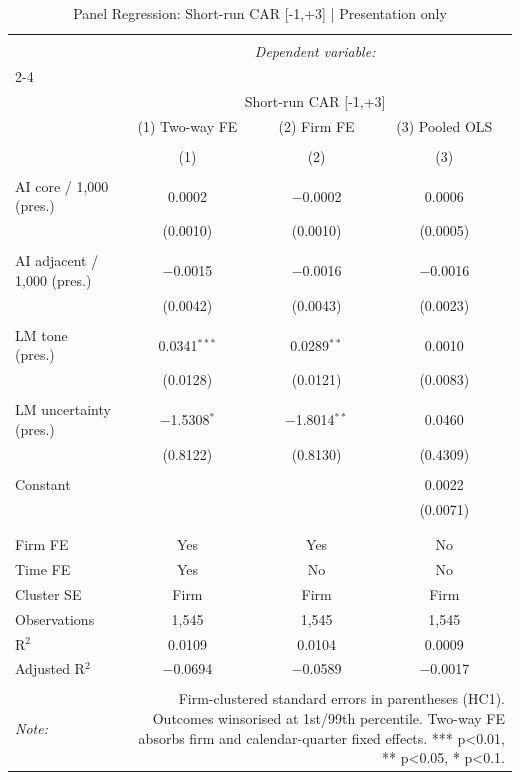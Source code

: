 
\begin{table}[!htbp] \centering 
  \caption{Panel Regression: Short-run CAR [-1,+3]  |  Presentation only} 
  \label{} 
\begin{tabular}{@{\extracolsep{5pt}}lccc} 
\\[-1.8ex]\hline 
\hline \\[-1.8ex] 
 & \multicolumn{3}{c}{\textit{Dependent variable:}} \\ 
\cline{2-4} 
\\[-1.8ex] & \multicolumn{3}{c}{Short-run CAR [-1,+3]} \\ 
 & (1) Two-way FE & (2) Firm FE & (3) Pooled OLS \\ 
\\[-1.8ex] & (1) & (2) & (3)\\ 
\hline \\[-1.8ex] 
 AI core / 1,000 (pres.) & 0.0002 & $-$0.0002 & 0.0006 \\ 
  & (0.0010) & (0.0010) & (0.0005) \\ 
  & & & \\ 
 AI adjacent / 1,000 (pres.) & $-$0.0015 & $-$0.0016 & $-$0.0016 \\ 
  & (0.0042) & (0.0043) & (0.0023) \\ 
  & & & \\ 
 LM tone (pres.) & 0.0341$^{***}$ & 0.0289$^{**}$ & 0.0010 \\ 
  & (0.0128) & (0.0121) & (0.0083) \\ 
  & & & \\ 
 LM uncertainty (pres.) & $-$1.5308$^{*}$ & $-$1.8014$^{**}$ & 0.0460 \\ 
  & (0.8122) & (0.8130) & (0.4309) \\ 
  & & & \\ 
 Constant &  &  & 0.0022 \\ 
  &  &  & (0.0071) \\ 
  & & & \\ 
\hline \\[-1.8ex] 
Firm FE & Yes & Yes & No \\ 
Time FE & Yes & No & No \\ 
Cluster SE & Firm & Firm & Firm \\ 
Observations & 1,545 & 1,545 & 1,545 \\ 
R$^{2}$ & 0.0109 & 0.0104 & 0.0009 \\ 
Adjusted R$^{2}$ & $-$0.0694 & $-$0.0589 & $-$0.0017 \\ 
\hline 
\hline \\[-1.8ex] 
\textit{Note:}  & \multicolumn{3}{r}{Firm-clustered standard errors in parentheses (HC1). Outcomes winsorised at 1st/99th percentile. Two-way FE absorbs firm and calendar-quarter fixed effects. *** p<0.01, ** p<0.05, * p<0.1.} \\ 
\end{tabular} 
\end{table} 
